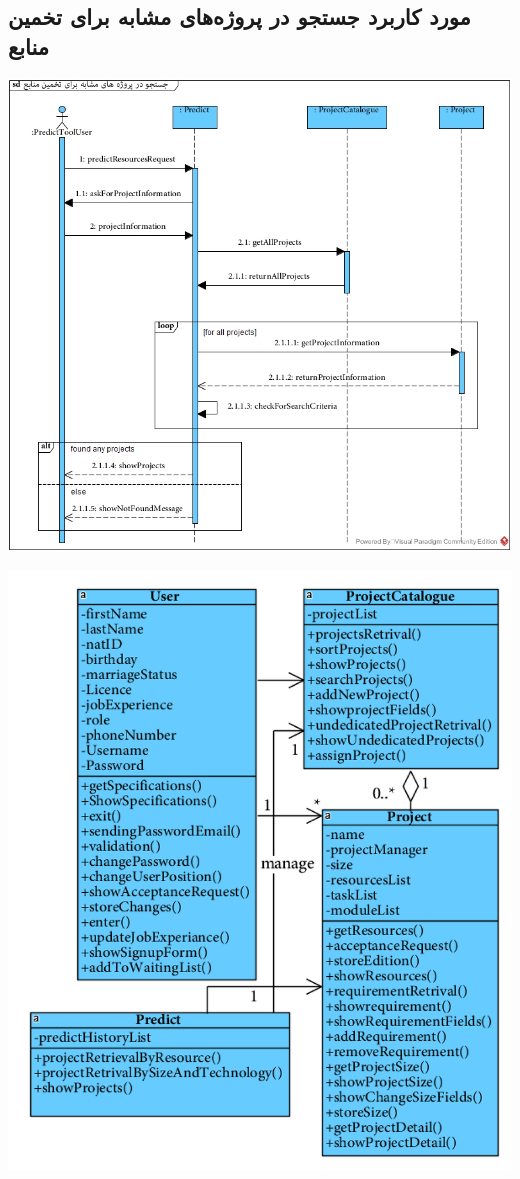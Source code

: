 \subsection*{مورد کاربرد جستجو در پروژه‌های مشابه برای تخمین منابع}
\vspace{2cm}
\begin{center}
\includegraphics[width=\textwidth]{SequenceDiagrams/44.jpg}
\end{center}

\newpage
\vspace{2cm}
\begin{center}
\includegraphics[width=\textwidth]{SequenceClasses/44.png}
\end{center}


